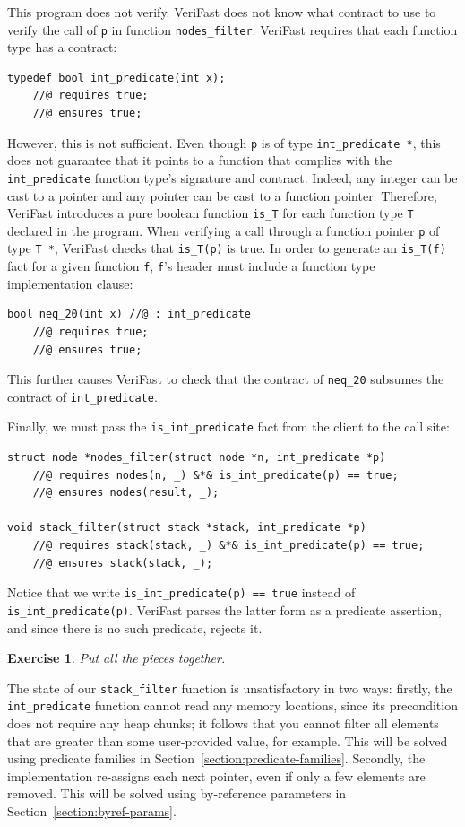 \documentclass{article}
\newtheorem{exercise}{Exercise}
\begin{document}
This program does not verify. VeriFast does not know what
contract to use to verify the call of \lstinline!p! in function
\lstinline!nodes_filter!. VeriFast requires that each function
type has a contract:
\begin{lstlisting}
typedef bool int_predicate(int x);
    //@ requires true;
    //@ ensures true;
\end{lstlisting}
However, this is not sufficient. Even though \lstinline!p! is
of type \lstinline!int_predicate *!, this does not guarantee
that it points to a function that complies with the
\lstinline!int_predicate! function type's signature and
contract. Indeed, any integer can be cast to a pointer and any
pointer can be cast to a function pointer. Therefore, VeriFast
introduces a pure boolean function \lstinline!is_T! for each
function type \lstinline!T! declared in the program. When
verifying a call through a function pointer \lstinline!p! of
type \lstinline!T *!, VeriFast checks that \lstinline!is_T(p)!
is true. In order to generate an \lstinline!is_T(f)! fact for a
given function \lstinline!f!, \lstinline!f!'s header must
include a function type implementation clause:
\begin{lstlisting}
bool neq_20(int x) //@ : int_predicate
    //@ requires true;
    //@ ensures true;
\end{lstlisting}
This further causes VeriFast to check that the contract of
\lstinline!neq_20! subsumes the contract of
\lstinline!int_predicate!.

Finally, we must pass the \lstinline!is_int_predicate! fact
from the client to the call site:
\begin{lstlisting}
struct node *nodes_filter(struct node *n, int_predicate *p)
    //@ requires nodes(n, _) &*& is_int_predicate(p) == true;
    //@ ensures nodes(result, _);

void stack_filter(struct stack *stack, int_predicate *p)
    //@ requires stack(stack, _) &*& is_int_predicate(p) == true;
    //@ ensures stack(stack, _);
\end{lstlisting}
Notice that we write \lstinline!is_int_predicate(p) == true!
instead of \lstinline!is_int_predicate(p)!. VeriFast parses the
latter form as a predicate assertion, and since there is no
such predicate, rejects it.

\begin{exercise}\label{exercise:filter}
Put all the pieces together.
\end{exercise}

The state of our \lstinline!stack_filter! function is
unsatisfactory in two ways: firstly, the
\lstinline!int_predicate! function cannot read any memory
locations, since its precondition does not require any heap
chunks; it follows that you cannot filter all elements that are
greater than some user-provided value, for example. This will
be solved using predicate families in
Section~\ref{section:predicate-families}. Secondly, the
implementation re-assigns each next pointer, even if only a few
elements are removed. This will be solved using by-reference
parameters in Section~\ref{section:byref-params}.
\end{document}
